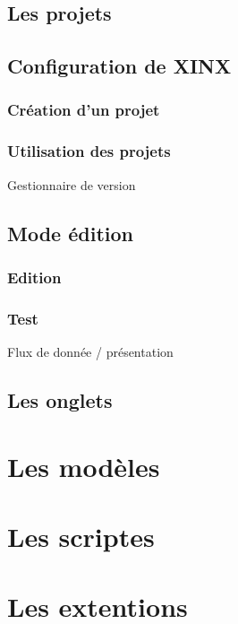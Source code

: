 \documentclass[a4paper,10pt,twoside]{book}
\begin{document}
\section{Les projets}

\section{Configuration de XINX}

\subsection{Création d'un projet}

\subsection{Utilisation des projets}
\label{sec:RCS}
Gestionnaire de version

\section{Mode édition}

\subsection{Edition}

\subsection{Test}

Flux de donnée / présentation

\section{Les onglets}

\chapter{Les modèles}

\chapter{Les scriptes}
\label{sec:Scripts}

\chapter{Les extentions}
\end{document}
